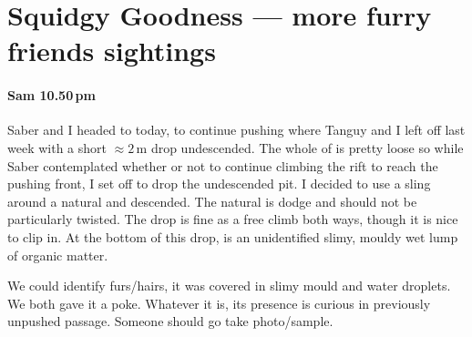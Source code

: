 \section{Squidgy Goodness --- more furry friends sightings}

\paragraph{Sam 10.50\,pm} Saber and I headed to  today, to continue pushing where Tanguy and I left off last week with a short $\approx2$\,m drop undescended. The whole of  is pretty loose so while Saber contemplated whether or not to continue climbing the rift to reach the pushing front, I set off to drop the undescended pit.
I decided to use a sling around a natural and descended. The natural is dodge and should not be particularly twisted. The drop is fine as a free climb both ways, though it is nice to clip in. At the bottom of this drop, is an unidentified slimy, mouldy wet lump of organic matter.

We could identify furs/hairs, it was covered in slimy mould and water droplets. We both gave it a poke. Whatever it is, its presence is curious in previously unpushed passage. Someone should go take photo/sample.



